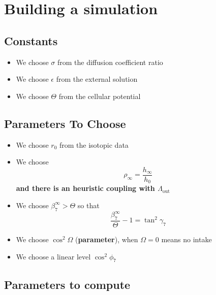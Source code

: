 \documentclass[aps,onecolumn,10pt]{revtex4}
\newcommand{\LiAll}{\Lambda}
\newcommand{\LiAllOut}{{\LiAll}_{\mathrm{out}}}
\begin{document}
\section{Building a simulation}

\subsection{Constants}

\begin{itemize}
	\item We choose $\sigma$ from the diffusion coefficient ratio
	\item We choose $\epsilon$ from the external solution
	\item We choose $\Theta$ from the cellular potential
\end{itemize}


\subsection{Parameters To Choose}
\begin{itemize}
	\item We choose $r_0$ from the isotopic data
	
	\item We choose 
	\begin{equation}
		\rho_\infty =  \dfrac{h_\infty}{h_0}
	\end{equation}
	\textbf{and there is an heuristic coupling with $\LiAllOut$}
	
	\item We choose $\beta_7^\infty>\Theta$ so that
	\begin{equation}
		\dfrac{\beta_7^\infty}{\Theta}-1 = \tan^2 \gamma_7 %
	\end{equation}
	
	\item We choose $\cos^2\Omega$ (\textbf{parameter}), when $\Omega=0$ means no intake 

	\item We choose a linear level $\cos^2 \phi_7$
	
\end{itemize}

\subsection{Parameters to compute}
\end{document}

